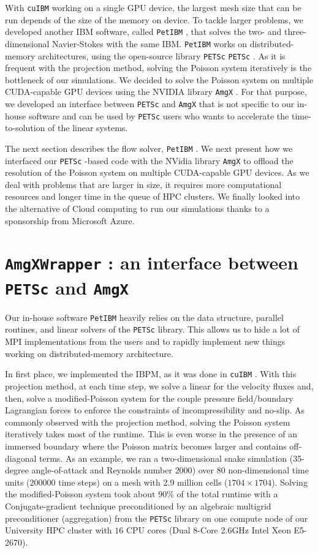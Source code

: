 \documentclass[10pt]{article}
\newcommand{\petibm}{\texttt{PetIBM} }
\newcommand{\petsc}{\texttt{PETSc} }
\newcommand{\cuibm}{\texttt{cuIBM} }
\newcommand{\amgx}{\texttt{AmgX} }
\newcommand{\amgxwrapper}{\texttt{AmgXWrapper} }
\begin{document}
With \cuibm working on a single GPU device, the largest mesh size that can be run depends of the size of the memory on device.
To tackle larger problems, we developed another IBM software, called \petibm, that solves the two- and three-dimensional Navier-Stokes with the same IBM.
\petibm works on distributed-memory architectures, using the open-source library \petsc\petsc\cite{PETSc_webpage_2017,PETSc_users_manual_2017,Balay_et_al_1997}.
As it is frequent with the projection method, solving the Poisson system iteratively is the bottleneck of our simulations.
We decided to solve the Poisson system on multiple CUDA-capable GPU devices using the NVIDIA library \amgx\cite{Naumov_et_al_2015, Nvidia_AmgX_webpage}.
For that purpose, we developed an interface between \petsc and \amgx that is not specific to our in-house software and can be used by \petsc users who wants to accelerate the time-to-solution of the linear systems.

The next section describes the flow solver, \petibm\cite{PetIBM}. We next present how we interfaced our \petsc-based code with the NVidia library \amgx to offload the resolution of the Poisson system on multiple CUDA-capable GPU devices.
As we deal with problems that are larger in size, it requires more computational resources and longer time in the queue of HPC clusters.
We finally looked into the alternative of Cloud computing to run our simulations thanks to a sponsorship from Microsoft Azure.


\section{\amgxwrapper: an interface between \petsc and \amgx}

Our in-house software \petibm heavily relies on the data structure, parallel routines, and linear solvers of the \petsc library.
This allows us to hide a lot of MPI implementations from the users and to rapidly implement new things working on distributed-memory architecture.

In first place, we implemented the IBPM, as it was done in \cuibm.
With this projection method, at each time step, we solve a linear for the velocity fluxes and, then, solve a modified-Poisson system for the couple pressure field/boundary Lagrangian forces to enforce the constraints of incompressibility and no-slip.
As commonly observed with the projection method, solving the Poisson system iteratively takes most of the runtime.
This is even worse in the presence of an immersed boundary where the Poisson matrix becomes larger and contains off-diagonal terms.
As an example, we ran a two-dimensional snake simulation (35-degree angle-of-attack and Reynolds number $2000$) over $80$ non-dimensional time units ($200000$ time steps) on a mesh with 2.9 million cells ($1704\times1704$).
Solving the modified-Poisson system took about $90\%$ of the total runtime with a Conjugate-gradient technique preconditioned by an algebraic multigrid preconditioner (aggregation) from the \petsc library on one compute node of our University HPC cluster with $16$ CPU cores (Dual 8-Core 2.6GHz Intel Xeon E5-2670).
\end{document}
